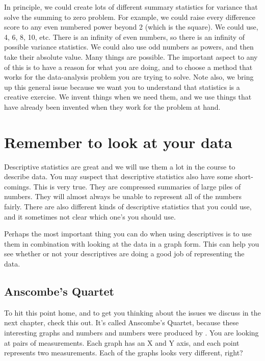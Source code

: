 \documentclass[]{book}
\begin{document}
In principle, we could create lots of different summary statistics for variance that solve the summing to zero problem. For example, we could raise every difference score to any even numbered power beyond 2 (which is the square). We could use, 4, 6, 8, 10, etc. There is an infinity of even numbers, so there is an infinity of possible variance statistics. We could also use odd numbers as powers, and then take their absolute value. Many things are possible. The important aspect to any of this is to have a reason for what you are doing, and to choose a method that works for the data-analysis problem you are trying to solve. Note also, we bring up this general issue because we want you to understand that statistics is a creative exercise. We invent things when we need them, and we use things that have already been invented when they work for the problem at hand.

\hypertarget{remember-to-look-at-your-data}{%
\section{Remember to look at your data}\label{remember-to-look-at-your-data}}

Descriptive statistics are great and we will use them a lot in the course to describe data. You may suspect that descriptive statistics also have some short-comings. This is very true. They are compressed summaries of large piles of numbers. They will almost always be unable to represent all of the numbers fairly. There are also different kinds of descriptive statistics that you could use, and it sometimes not clear which one's you should use.

Perhaps the most important thing you can do when using descriptives is to use them in combination with looking at the data in a graph form. This can help you see whether or not your descriptives are doing a good job of representing the data.

\hypertarget{anscombes-quartet}{%
\subsection{Anscombe's Quartet}\label{anscombes-quartet}}

To hit this point home, and to get you thinking about the issues we discuss in the next chapter, check this out. It's called Anscombe's Quartet, because these interesting graphs and numbers and numbers were produced by \citet{Anscombe1973}. You are looking at pairs of measurements. Each graph has an X and Y axis, and each point represents two measurements. Each of the graphs looks very different, right?
\end{document}
